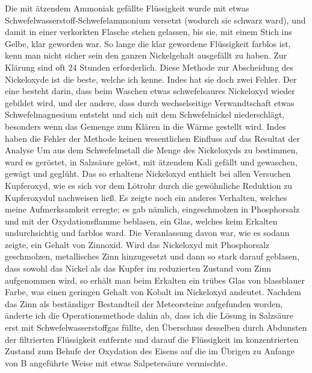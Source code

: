 \documentclass[a4paper, 11pt, oneside]{article}
\begin{document}
Die mit ätzendem Ammoniak gefällte Flüssigkeit wurde mit etwas Schwefelwasserstoff-Schwefelammonium versetzt (wodurch sie schwarz ward), und damit in einer verkorkten Flasche stehen gelassen, bis sie, mit einem Stich ins Gelbe, klar geworden war. So lange die klar gewordene Flüssigkeit farblos ist, kenn man nicht sicher sein den ganzen Nickelgehalt ausgefällt zu haben. Zur Klärung sind oft 24 Stunden erforderlich. Diese Methode zur Abscheidung des Nickeloxyde ist die beste, welche ich kenne. Indes hat sie doch zwei Fehler. Der eine besteht darin, dass beim Waschen etwas schwefelsaures Nickeloxyd wieder gebildet wird, und der andere, dass durch wechselseitige Verwandtschaft etwas Schwefelmagnesium entsteht und sich mit dem Schwefelnickel niederschlägt, besonders wenn das Gemenge zum Klären in die Wärme gestellt wird. Indes haben die Fehler der Methode keinen wesentlichen Einfluss auf das Resultat der Analyse Um aus dem Schwefelmetall die Menge des Nickeloxyds zu bestimmen, ward es geröstet, in Salzsäure gelöst, mit ätzendem Kali gefällt und gewaschen, gewägt und geglüht. Das so erhaltene Nickeloxyd enthielt bei allen Versuchen Kupferoxyd, wie es sich vor dem Lötrohr durch die gewöhnliche Reduktion zu Kupferoxydul nachweisen ließ. Es zeigte noch ein anderes Verhalten, welches meine Aufmerksamkeit erregte; es gab nämlich, eingeschmolzen in Phosphorsalz und mit der Oxydationsflamme beblasen, ein Glas, welches keim Erkalten undurchsichtig und farblos ward. Die Veranlassung davon war, wie es sodann zeigte, ein Gehalt von Zinnoxid. Wird das Nickeloxyd mit Phosphorsalz geschmolzen, metallisches Zinn hinzugesetzt und dann so stark darauf geblasen, dass sowohl das Nickel als das Kupfer im reduzierten Zustand vom Zinn aufgenommen wird, so erhält man beim Erkalten ein trübes Glas von blassblauer Farbe, was einen geringen Gehalt von Kobalt im Nickeloxyd andeutet. Nachdem das Zinn als beständiger Bestandteil der Meteorsteine aufgefunden worden, änderte ich die Operationsmethode dahin ab, dass ich die Lösung in Salzsäure erst mit Schwefelwasserstoffgas füllte, den Überschuss desselben durch Abdunsten der filtrierten Flüssigkeit entfernte und darauf die Flüssigkeit im konzentrierten Zustand zum Behufe der Oxydation des Eisens auf die im Übrigen zu Anfange von B angeführte Weise mit etwas Salpetersäure vermischte.
\end{document}
